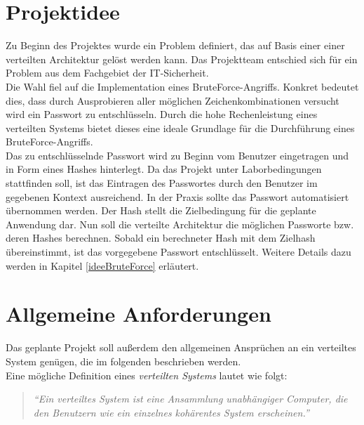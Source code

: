\section{Projektidee}
\label{Projektidee}
Zu Beginn des Projektes wurde ein Problem definiert, das auf Basis einer einer verteilten Architektur gelöst werden kann. Das Projektteam entschied sich für ein Problem aus dem Fachgebiet der IT-Sicherheit.\\
Die Wahl fiel auf die Implementation eines BruteForce-Angriffs. Konkret bedeutet dies, dass durch Ausprobieren aller möglichen Zeichenkombinationen versucht wird ein Passwort zu entschlüsseln. Durch die hohe Rechenleistung eines verteilten Systems bietet dieses eine ideale Grundlage für die Durchführung eines BruteForce-Angriffs.\\
 Das zu entschlüsselnde Passwort wird zu Beginn vom Benutzer eingetragen und in Form eines Hashes hinterlegt. Da das Projekt unter Laborbedingungen stattfinden soll, ist das Eintragen des Passwortes durch den Benutzer im gegebenen Kontext ausreichend. In der Praxis sollte das Passwort automatisiert übernommen werden. 
 Der Hash stellt die Zielbedingung für die geplante Anwendung dar. Nun soll die verteilte Architektur die möglichen Passworte bzw. deren Hashes berechnen. Sobald ein berechneter Hash mit dem Zielhash übereinstimmt, ist das vorgegebene Passwort entschlüsselt. Weitere Details dazu werden in Kapitel \ref{ideeBruteForce} erläutert. \\
 


\section{Allgemeine Anforderungen}
\label{allgemeineAnforderungen}
Das geplante Projekt soll außerdem den allgemeinen Ansprüchen an ein verteiltes System genügen, die im folgenden beschrieben werden. \\
Eine mögliche Definition eines \emph{verteilten Systems} lautet wie folgt:
\begin{quotation}
	\textit{\enquote{Ein verteiltes System ist eine Ansammlung unabhängiger Computer, die den Benutzern wie ein einzelnes kohärentes System erscheinen.}} \citep{tanenbaum}
\end{quotation}

